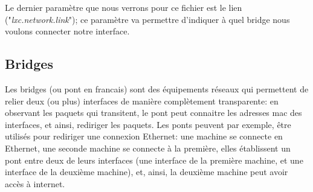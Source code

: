 \documentclass{article}
\begin{document}
Le dernier param\`etre que nous verrons pour ce fichier est le lien ("\emph{lxc.network.link}"); ce param\`etre
va permettre d'indiquer \`a quel bridge nous voulons connecter notre interface.\\


\subsection{Bridges}
Les bridges (ou pont en francais) sont des \'equipements r\'eseaux qui permettent de relier deux (ou plus)
interfaces de mani\`ere compl\`etement transparente: en observant les paquets qui transitent, le pont peut 
connaitre les adresses mac des interfaces, et ainsi, rediriger les paquets. Les ponts peuvent par exemple,
\^etre utilis\'es pour rediriger une connexion Ethernet: une machine se connecte en Ethernet, une seconde 
machine se connecte \`a la premi\`ere, elles \'etablissent un pont entre deux de leurs interfaces (une interface
de la premi\`ere machine, et une interface de la deuxi\`eme machine), et, ainsi, la deuxi\`eme machine peut 
avoir acc\`es \`a internet.\\
\end{document}
